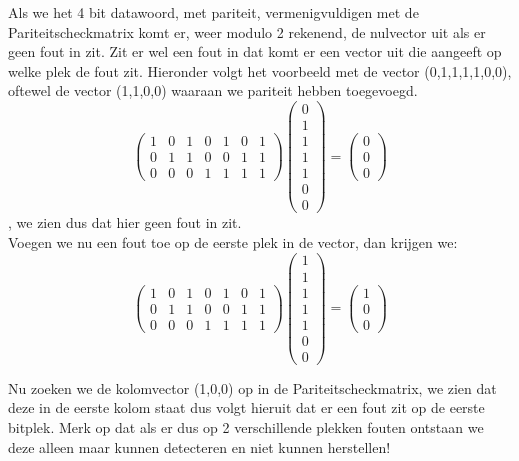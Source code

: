\documentclass[a4paper]{article}
\begin{document}
Als we het 4 bit datawoord, met pariteit, vermenigvuldigen met de Pariteitscheckmatrix komt er, weer modulo 2 rekenend, de nulvector uit als er geen fout in zit. Zit er wel een fout in dat komt er een vector uit die aangeeft op welke plek de fout zit. Hieronder volgt het voorbeeld met de vector (0,1,1,1,1,0,0), oftewel de vector (1,1,0,0) waaraan we pariteit hebben toegevoegd.
\begin{equation*}
	\begin{pmatrix}
		1&0&1&0&1&0&1 \\
		0&1&1&0&0&1&1 \\
		0&0&0&1&1&1&1
	\end{pmatrix}
	\begin{pmatrix}
		0\\1\\1\\1\\1\\0\\0
	\end{pmatrix}
	=
	\begin{pmatrix}
		0\\0\\0
	\end{pmatrix}
\end{equation*}
, we zien dus dat hier geen fout in zit.
\\ Voegen we nu een fout toe op de eerste plek in de vector, dan krijgen we:\\
\begin{equation*}
	\begin{pmatrix}
		1&0&1&0&1&0&1 \\
		0&1&1&0&0&1&1 \\
		0&0&0&1&1&1&1
	\end{pmatrix}
	\begin{pmatrix}
		1\\1\\1\\1\\1\\0\\0
	\end{pmatrix}
	=
	\begin{pmatrix}
		1\\0\\0
	\end{pmatrix}
 \end{equation*}

Nu zoeken we de kolomvector (1,0,0) op in de Pariteitscheckmatrix, we zien dat deze in de eerste kolom staat dus volgt hieruit dat er een fout zit op de eerste bitplek. Merk op dat als er dus op 2 verschillende plekken fouten ontstaan we deze alleen maar kunnen detecteren en niet kunnen herstellen!
\end{document}
